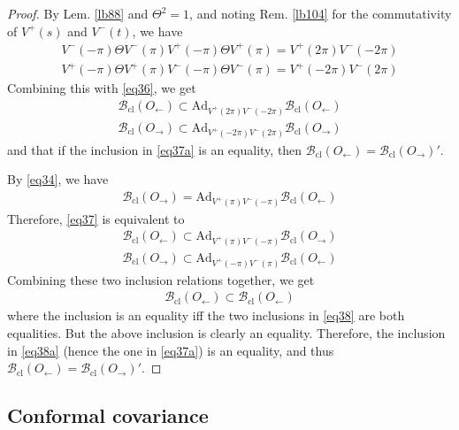 \documentclass[11pt,b5paper,notitlepage]{article}
\theoremstyle{definition}
\theoremstyle{plain}
\newcommand{\Ad}{\mathrm{Ad}}
\newcommand{\Bcl}{\mathcal B_{\mathrm{cl}}}
\numberwithin{equation}{section}
\begin{document}
\begin{proof}
By Lem. \ref{lb88} and $\Theta^2=1$, and noting Rem. \ref{lb104} for the commutativity of $V^+(s)$ and $V^-(t)$, we have
\begin{gather*}
V^-(-\pi)\Theta V^-(\pi)V^+(-\pi)\Theta V^+(\pi)=V^+(2\pi)V^-(-2\pi)\\
V^+(-\pi)\Theta V^+(\pi)V^-(-\pi)\Theta V^-(\pi)=V^+(-2\pi)V^-(2\pi)
\end{gather*}
Combining this with \eqref{eq36}, we get
\begin{subequations}\label{eq37}
\begin{gather}
\Bcl(O_\leftarrow)\subset \Ad_{V^+(2\pi)V^-(-2\pi)}\Bcl(O_\leftarrow)\label{eq37a}\\
\Bcl(O_\rightarrow)\subset \Ad_{V^+(-2\pi)V^-(2\pi)}\Bcl(O_\rightarrow)
\end{gather}
\end{subequations}
and that if the inclusion in \eqref{eq37a} is an equality, then $\Bcl(O_\leftarrow)=\Bcl(O_\rightarrow)'$.


By \eqref{eq34}, we have
\begin{align*}
\Bcl(O_\rightarrow)=\Ad_{V^+(\pi)V^-(-\pi)}\Bcl(O_\leftarrow)
\end{align*}
Therefore, \eqref{eq37} is equivalent to
\begin{subequations}\label{eq38}
\begin{gather}
\Bcl(O_\leftarrow)\subset\Ad_{V^+(\pi)V^-(-\pi)}\Bcl(O_\rightarrow)\label{eq38a}\\
\Bcl(O_\rightarrow)\subset\Ad_{V^+(-\pi)V^-(\pi)}\Bcl(O_\leftarrow)
\end{gather}
\end{subequations}
Combining these two inclusion relations together, we get
\begin{align*}
\Bcl(O_\leftarrow)\subset \Bcl(O_\leftarrow)
\end{align*}
where the inclusion is an equality iff the two inclusions in \eqref{eq38} are both equalities. But the above inclusion is clearly an equality. Therefore, the inclusion in \eqref{eq38a} (hence the one in \eqref{eq37a}) is an equality, and thus $\Bcl(O_\leftarrow)=\Bcl(O_\rightarrow)'$. 
\end{proof}






\subsection{Conformal covariance}\label{lb100}
\end{document}
